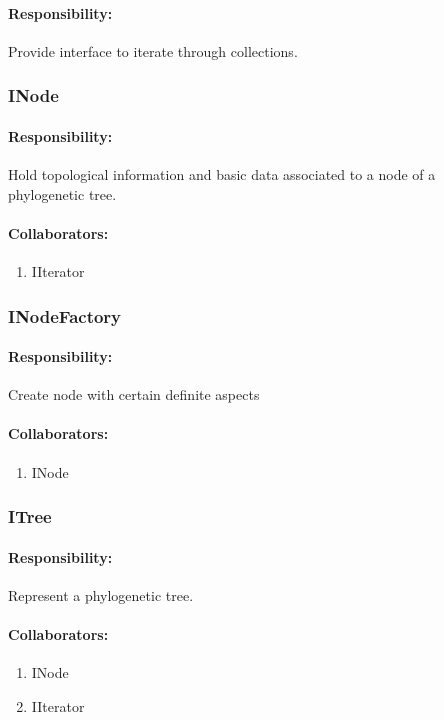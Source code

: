 \documentclass[a4paper,10pt]{article}
\begin{document}
    \paragraph{Responsibility:} Provide interface to iterate through collections.

  \subsubsection{INode}
    \paragraph{Responsibility:} Hold topological information and basic data associated to a node of a phylogenetic tree.
    \paragraph{Collaborators:}
      \begin{enumerate}
       \item IIterator
      \end{enumerate}
	  
	    
	\subsubsection{INodeFactory}
    \paragraph{Responsibility:} Create node with certain definite aspects
    \paragraph{Collaborators:}
      \begin{enumerate}
       \item INode
      \end{enumerate}

  \subsubsection{ITree}
    \paragraph{Responsibility:} Represent a phylogenetic tree.
    \paragraph{Collaborators:}
      \begin{enumerate}
       \item INode
       \item IIterator
      \end{enumerate}
\end{document}
